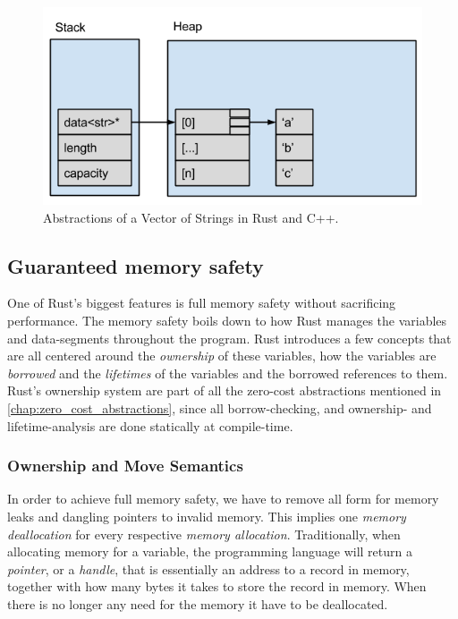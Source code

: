 \begin{figure}[tb]
  \begin{center}
    \includegraphics[scale=0.5]{figures/cpp_abstractions}
  \end{center}
  \caption{Abstractions of a Vector of Strings in Rust and C++.}
  \label{fig:cpp_abstractions}
\end{figure}

\subsection{Guaranteed memory safety}

One of Rust's biggest features is full memory safety \cite{web:rust_book_unsafe} without sacrificing performance.
The memory safety boils down to how Rust manages the variables and data-segments throughout the program.
Rust introduces a few concepts that are all centered around the \emph{ownership} of these variables, how the variables are \emph{borrowed} and the \emph{lifetimes} of the variables and the borrowed references to them.
Rust's ownership system are part of all the zero-cost abstractions mentioned in \autoref{chap:zero_cost_abstractions}, since all borrow-checking, and ownership- and lifetime-analysis are done statically at compile-time.

\subsubsection{Ownership and Move Semantics}
\label{sec:back:rust:own}

In order to achieve full memory safety, we have to remove all form for memory leaks and dangling pointers to invalid memory.
This implies one \emph{memory deallocation} for every respective \emph{memory allocation}.
Traditionally, when allocating memory for a variable, the programming language will return a \emph{pointer},  or a \emph{handle}, that is essentially an address to a record in memory, together with how many bytes it takes to store the record in memory.
When there is no longer any need for the memory it have to be deallocated.

